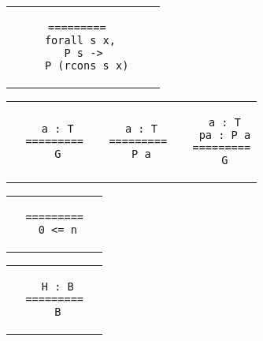\begin{landscape}
\begin{small}
\begin{multicols*}{3}[\begin{center}\section*{}\end{center}]
\begin{tabular}{c@{$\to$}cc}
\begin{minipage}{0.12\textwidth}
\begin{lstlisting}
  =========
   forall s x,
    P s ->
     P (rcons s x)
  \end{lstlisting}\end{minipage}
  \end{tabular}
  \begin{tabular}{c@{$\to$}cc}
  \begin{minipage}{0.10\textwidth}\begin{lstlisting}
   a : T
  =========
   G
  \end{lstlisting}\end{minipage}
  &
  \begin{minipage}{0.10\textwidth}\begin{lstlisting}
   a : T
  =========
   P a
  \end{lstlisting}\end{minipage}
  &
  \begin{minipage}{0.10\textwidth}\begin{lstlisting}
   a : T
   pa : P a
  =========
   G
  \end{lstlisting}\end{minipage}
  \end{tabular}
  \begin{tabular}{c@{$\to$}c}
  \begin{minipage}{0.15\textwidth}\begin{lstlisting}
  =========
   0 <= n
  \end{lstlisting}\end{minipage}
  &
  \begin{minipage}{0.15\textwidth}\begin{lstlisting}
  \end{lstlisting}\end{minipage}
  \end{tabular}
  \begin{tabular}{c@{$\to$}c}
  \begin{minipage}{0.15\textwidth}\begin{lstlisting}
   H : B
  =========
   B
  \end{lstlisting}\end{minipage}
  &
  \begin{minipage}{0.15\textwidth}\begin{lstlisting}
  \end{lstlisting}\end{minipage}
  \end{tabular}


\end{multicols*}
\end{small}
\end{landscape}
